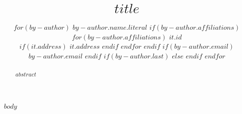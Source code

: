 \documentclass[11pt]{article}
\title{$title$}
\author{
$for(by-author)$
  $by-author.name.literal$ %
  $if(by-author.affiliations)$
    \\ $for(by-author.affiliations)$
      $it.id$ %
      \\ $if(it.address)$
        $it.address$ %
      $endif$
    $endfor$
  $endif$
  $if(by-author.email)$
    \\ \texttt{$by-author.email$} %
  $endif$
  $if(by-author.last)$
    \AND
  $else$
    \And
  $endif$
$endfor$
}
\begin{document}
\maketitle

\begin{abstract}
$abstract$
\end{abstract}


$body$
\end{document}
